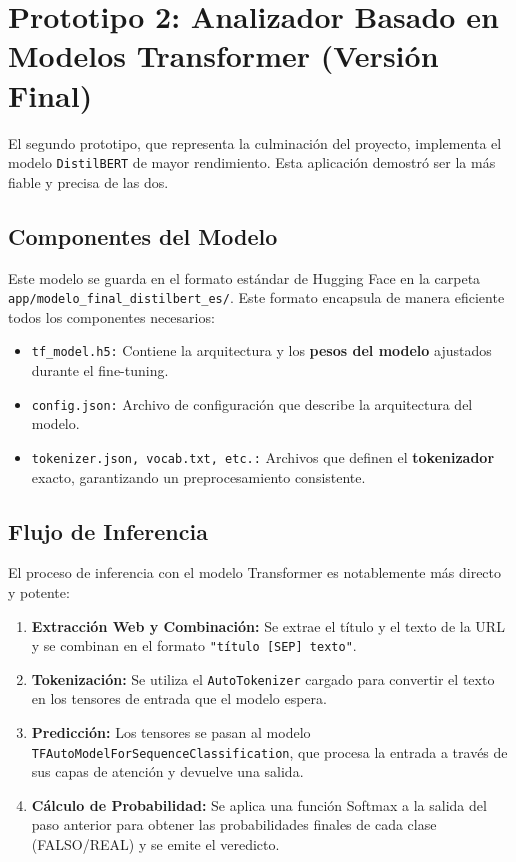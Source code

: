 \section{Prototipo 2: Analizador Basado en Modelos Transformer (Versión Final)}
El segundo prototipo, que representa la culminación del proyecto, implementa el modelo \texttt{DistilBERT} de mayor rendimiento. Esta aplicación demostró ser la más fiable y precisa de las dos.

\subsection{Componentes del Modelo}
Este modelo se guarda en el formato estándar de Hugging Face en la carpeta \texttt{app/modelo\_final\_distilbert\_es/}. Este formato encapsula de manera eficiente todos los componentes necesarios:
\begin{itemize}
    \item \texttt{tf\_model.h5:} Contiene la arquitectura y los \textbf{pesos del modelo} ajustados durante el fine-tuning.
    \item \texttt{config.json:} Archivo de configuración que describe la arquitectura del modelo.
    \item \texttt{tokenizer.json, vocab.txt, etc.:} Archivos que definen el \textbf{tokenizador} exacto, garantizando un preprocesamiento consistente.
\end{itemize}

\subsection{Flujo de Inferencia}
El proceso de inferencia con el modelo Transformer es notablemente más directo y potente:
\begin{enumerate}
    \item \textbf{Extracción Web y Combinación:} Se extrae el título y el texto de la URL y se combinan en el formato \texttt{"título [SEP] texto"}.
    \item \textbf{Tokenización:} Se utiliza el \texttt{AutoTokenizer} cargado para convertir el texto en los tensores de entrada que el modelo espera.
    \item \textbf{Predicción:} Los tensores se pasan al modelo \texttt{TFAutoModelForSequenceClassification}, que procesa la entrada a través de sus capas de atención y devuelve una salida.
    \item \textbf{Cálculo de Probabilidad:} Se aplica una función Softmax a la salida del paso anterior para obtener las probabilidades finales de cada clase (FALSO/REAL) y se emite el veredicto.
\end{enumerate}

